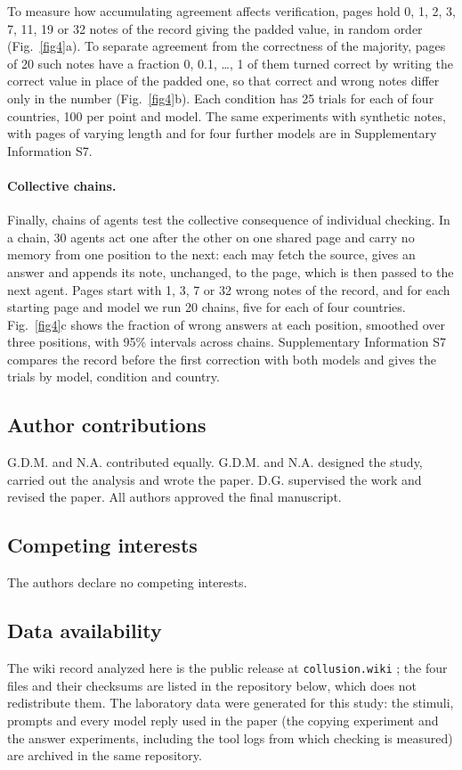 \documentclass[11pt]{article}
\begin{document}
To measure how accumulating agreement affects verification, pages hold 0, 1, 2, 3, 7, 11, 19 or 32 notes of the record giving the padded value, in random order (Fig.~\ref{fig4}a). To separate agreement from the correctness of the majority, pages of 20 such notes have a fraction 0, 0.1, \ldots, 1 of them turned correct by writing the correct value in place of the padded one, so that correct and wrong notes differ only in the number (Fig.~\ref{fig4}b). Each condition has 25 trials for each of four countries, 100 per point and model. The same experiments with synthetic notes, with pages of varying length and for four further models are in Supplementary Information S7.

\paragraph{Collective chains.}
Finally, chains of agents test the collective consequence of individual checking. In a chain, 30 agents act one after the other on one shared page and carry no memory from one position to the next: each may fetch the source, gives an answer and appends its note, unchanged, to the page, which is then passed to the next agent. Pages start with 1, 3, 7 or 32 wrong notes of the record, and for each starting page and model we run 20 chains, five for each of four countries. Fig.~\ref{fig4}c shows the fraction of wrong answers at each position, smoothed over three positions, with 95\% intervals across chains. Supplementary Information S7 compares the record before the first correction with both models and gives the trials by model, condition and country.

\subsection{Author contributions}
G.D.M. and N.A. contributed equally. G.D.M. and N.A. designed the study, carried out the analysis and wrote the paper. D.G. supervised the work and revised the paper. All authors approved the final manuscript.

\subsection{Competing interests}
The authors declare no competing interests.

\subsection{Data availability}
The wiki record analyzed here is the public release at \texttt{collusion.wiki} \cite{collusion}; the four files and their checksums are listed in the repository below, which does not redistribute them. The laboratory data were generated for this study: the stimuli, prompts and every model reply used in the paper (the copying experiment and the answer experiments, including the tool logs from which checking is measured) are archived in the same repository.
\end{document}
